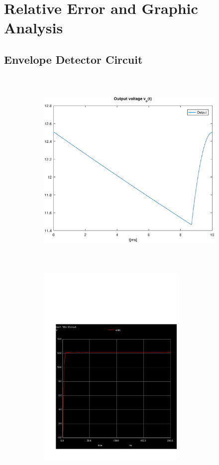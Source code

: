\section{Relative Error and Graphic Analysis}
\label{sec:erroranalysis}


\subsection{Envelope Detector Circuit}
\label{subsec:first_topic_error}

\begin{figure}[H]

\begin{subfigure}{0.5\textwidth}
\includegraphics[width=0.9\linewidth, height=10cm]{envelope.eps} 
\label{fig:theofirstcompare}
\end{subfigure}
\begin{subfigure}{0.5\textwidth}
\includegraphics[width=0.9\linewidth, height=10cm]{trans1.pdf}
\label{fig:simfirstcompare}
\end{subfigure}

\label{fig:compar1}
\end{figure}

